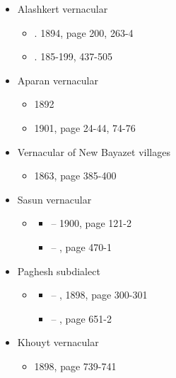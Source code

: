 \begin{itemize}
\begin{itemize}
\begin{itemize}
		\end{itemize}
		\item Alashkert vernacular
		\begin{itemize}
			\item {}. 1894, page 200, 263-4
			\item {}. 185-199,  437-505
			
		\end{itemize}
		\item Aparan vernacular
		\begin{itemize}
			\item {} 1892
			\item {} 1901, page 24-44, 74-76
			
		\end{itemize}
		\item Vernacular of New Bayazet villages
		\begin{itemize}
			\item {} 1863, page 385-400
			
		\end{itemize}
		\item Sasun vernacular
		\begin{itemize}
			\item {} 
			\begin{itemize}
				\item –  1900, page 121-2
				\item – , page 470-1
			\end{itemize}
			
		\end{itemize}
		\item Paghesh subdialect
		\begin{itemize}
			\item {}
			\begin{itemize}
				\item – , 1898, page 300-301
				\item – , page 651-2
			\end{itemize}
			
		\end{itemize}
		\item Khouyt vernacular
		\begin{itemize}
			\item {} 1898, page 739-741
			
		\end{itemize}
	\end{itemize}
\end{itemize}

